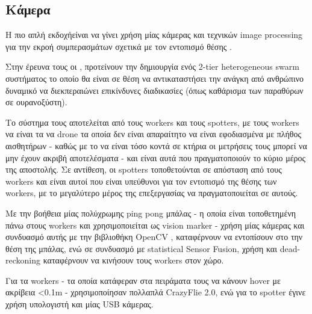 \subsection{Κάμερα} \label{sec:related-camera}
H πιο απλή εκδοχή\udot είναι να γίνει χρήση μίας κάμερας και τεχνικών image processing για την εκροή συμπερασμάτων σχετικά με τον εντοπισμό θέσης .

Στην έρευνα τους οι \cite{related-simple-camera}, προτείνουν την δημιουργία ενός 2-tier heterogeneous  swarm συστήματος το οποίο θα είναι σε θέση να αντικαταστήσει την ανάγκη από ανθρώπινο δυναμικό να διεκπεραιώνει επικίνδυνες διαδικασίες (όπως καθάρισμα των παραθύρων σε ουρανοξύστη).

Το σύστημα τους αποτελείται από τους workers και τους spotters, με τους workers να είναι τα να drone τα οποία δεν είναι απαραίτητο να είναι εφοδιασμένα με πλήθος αισθητήρων - καθώς με το να είναι τόσο κοντά σε κτήρια οι μετρήσεις τους μπορεί να μην έχουν ακριβή αποτελέσματα - και είναι αυτά που πραγματοποιούν το κύριο μέρος της αποστολής. Σε αντίθεση, οι spotters τοποθετούνται σε απόσταση από τους workers και είναι αυτοί που είναι υπεύθυνοι για τον εντοπισμό της θέσης των workers, με το μεγαλύτερο μέρος της επεξεργασίας να πραγματοποιείται σε αυτούς.

Με την βοήθεια μίας πολύχρωμης ping pong μπάλας - η οποία είναι τοποθετημένη πάνω στους workers και χρησιμοποιείται ως vision marker - χρήση μίας κάμερας και συνδυασμό αυτής με την βιβλιοθήκη OpenCV \cite{opencv}, καταφέρνουν να εντοπίσουν στο  την θέση της μπάλας, ενώ σε συνδυασμό με statistical Sensor Fusion, χρήση  και dead-reckoning καταφέρνουν να κινήσουν τους workers στον χώρο.

Για τα workers - τα οποία κατάφεραν στα πειράματα τους να κάνουν hover με ακρίβεια <0.1m - χρησιμοποίησαν πολλαπλά CrazyFlie 2.0, ενώ για το spotter έγινε χρήση υπολογιστή και μίας USB κάμερας.

